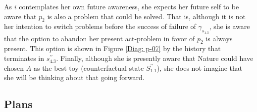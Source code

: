 \documentclass[
11pt,
titlepage,
reqno,
]{article}%
\theoremstyle{definition}
\begin{document}
As $i$ contemplates her own future awareness, she expects her future self to be aware that $p_2$ is also a problem that could be solved.
That is, although it is not her intention to switch problems before the success of failure of $\gamma_{s_{1.3}}$, she is aware that the option to abandon her present act-problem in favor of $p_2$ is always present. 
This option is shown in Figure \ref{Diag: p-07} by the history that terminates in  $s^{\prime\prime}_{4.3}$.
Finally, although she is presently aware that Nature could have chosen $A$ as the best toy (counterfactual state $S^{\prime\prime}_{1.1}$),
she does not imagine that she will be thinking about that going forward. 

\clearpage


\subsection{Plans}
%
%
%
%
%	
\end{document}
